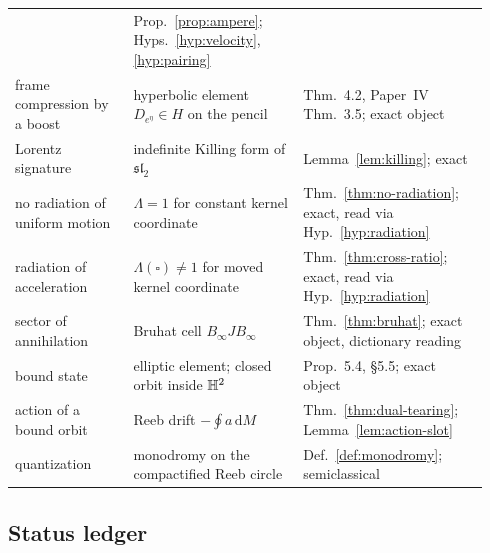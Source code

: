 {\begin{longtable}{@{}p{0.235\linewidth}p{0.335\linewidth}p{0.365\linewidth}@{}}
& Prop.~\ref{prop:ampere}; Hyps.~\ref{hyp:velocity}, \ref{hyp:pairing} \\
frame compression by a boost & hyperbolic element $D_{e^\eta}\in H$ on the
pencil
& Thm.~4.2, Paper~IV Thm.~3.5; exact object \\
Lorentz signature & indefinite Killing form of $\mathfrak{sl}_2$
& Lemma~\ref{lem:killing}; exact \\
no radiation of uniform motion & $\Lambda=1$ for constant kernel coordinate
& Thm.~\ref{thm:no-radiation}; exact, read via Hyp.~\ref{hyp:radiation} \\
radiation of acceleration & $\Lambda(\square)\ne1$ for moved kernel coordinate
& Thm.~\ref{thm:cross-ratio}; exact, read via Hyp.~\ref{hyp:radiation} \\
sector of annihilation & Bruhat cell $B_\infty JB_\infty$
& Thm.~\ref{thm:bruhat}; exact object, dictionary reading \\
bound state & elliptic element; closed orbit inside $\mathbb{H}^2$
& Prop.~5.4, \S 5.5; exact object \\
action of a bound orbit & Reeb drift $-\oint a\,\mathrm dM$
& Thm.~\ref{thm:dual-tearing}; Lemma~\ref{lem:action-slot} \\
quantization & monodromy on the compactified Reeb circle
& Def.~\ref{def:monodromy}; semiclassical \\
\end{longtable}}

\subsection{Status ledger}

